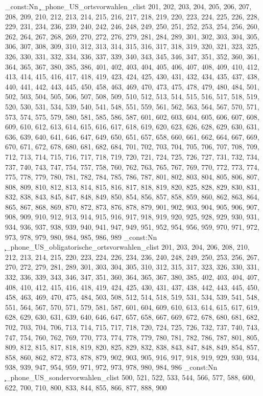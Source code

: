 \clist_const:Nn \c_phone_US_ortsvorwahlen_clist {201,
202,
203,
204,
205,
206,
207,
208,
209,
210,
212,
213,
214,
215,
216,
217,
218,
219,
220,
223,
224,
225,
226,
228,
229,
231,
234,
236,
239,
240,
242,
246,
248,
249,
250,
251,
252,
253,
254,
256,
260,
262,
264,
267,
268,
269,
270,
272,
276,
279,
281,
284,
289,
301,
302,
303,
304,
305,
306,
307,
308,
309,
310,
312,
313,
314,
315,
316,
317,
318,
319,
320,
321,
323,
325,
326,
330,
331,
332,
334,
336,
337,
339,
340,
343,
345,
346,
347,
351,
352,
360,
361,
364,
365,
367,
380,
385,
386,
401,
402,
403,
404,
405,
406,
407,
408,
409,
410,
412,
413,
414,
415,
416,
417,
418,
419,
423,
424,
425,
430,
431,
432,
434,
435,
437,
438,
440,
441,
442,
443,
445,
450,
458,
463,
469,
470,
473,
475,
478,
479,
480,
484,
501,
502,
503,
504,
505,
506,
507,
508,
509,
510,
512,
513,
514,
515,
516,
517,
518,
519,
520,
530,
531,
534,
539,
540,
541,
548,
551,
559,
561,
562,
563,
564,
567,
570,
571,
573,
574,
575,
579,
580,
581,
585,
586,
587,
601,
602,
603,
604,
605,
606,
607,
608,
609,
610,
612,
613,
614,
615,
616,
617,
618,
619,
620,
623,
626,
628,
629,
630,
631,
636,
639,
640,
641,
646,
647,
649,
650,
651,
657,
658,
660,
661,
662,
664,
667,
669,
670,
671,
672,
678,
680,
681,
682,
684,
701,
702,
703,
704,
705,
706,
707,
708,
709,
712,
713,
714,
715,
716,
717,
718,
719,
720,
721,
724,
725,
726,
727,
731,
732,
734,
737,
740,
743,
747,
754,
757,
758,
760,
762,
763,
765,
767,
769,
770,
772,
773,
774,
775,
778,
779,
780,
781,
782,
784,
785,
786,
787,
801,
802,
803,
804,
805,
806,
807,
808,
809,
810,
812,
813,
814,
815,
816,
817,
818,
819,
820,
825,
828,
829,
830,
831,
832,
838,
843,
845,
847,
848,
849,
850,
854,
856,
857,
858,
859,
860,
862,
863,
864,
865,
867,
868,
869,
870,
872,
873,
876,
878,
879, %
901,
902,
903,
904,
905,
906,
907,
908,
909,
910,
912,
913,
914,
915,
916,
917,
918,
919,
920,
925,
928,
929,
930,
931,
934,
936,
937,
938,
939,
940,
941,
947,
949,
951,
952,
954,
956,
959,
970,
971,
972,
973,
978,
979,
980,
984,
985,
986,
989}
\clist_const:Nn \c_phone_US_obligatorische_ortsvorwahlen_clist {201,
203,
204,
206,
208,
210,
212,
213,
214,
215,
220,
223,
224,
226,
234,
236,
240,
248,
249,
250,
253,
256,
267,
270,
272,
279,
281,
289,
301,
303,
304,
305,
310,
312,
315,
317,
323,
326,
330,
331,
332,
336,
339,
343,
346,
347,
351,
360,
364,
365,
367,
380,
385,
402,
403,
404,
407,
408,
410,
412,
415,
416,
418,
419,
424,
425,
430,
431,
437,
438,
442,
443,
445,
450,
458,
463,
469,
470,
475,
484,
503,
508,
512,
514,
518,
519,
531,
534,
539,
541,
548,
551,
564,
567,
570,
571,
579,
581,
587,
601,
604,
609,
610,
613,
614,
615,
617,
619,
628,
629,
630,
631,
639,
640,
646,
647,
657,
658,
667,
669,
672,
678,
680,
681,
682,
702,
703,
704,
706,
713,
714,
715,
717,
718,
720,
724,
725,
726,
732,
737,
740,
743,
747,
754,
760,
762,
769,
770,
773,
774,
778,
779,
780,
781,
782,
786,
787,
801,
805,
809,
812,
815,
817,
818,
819,
820,
825,
829,
832,
838,
843,
847,
848,
849,
854,
857,
858,
860,
862,
872,
873,
878,
879,
902,
903,
905,
916,
917,
918,
919,
929,
930,
934,
938,
939,
947,
954,
959,
971,
972,
973,
978,
980,
984,
986}
\clist_const:Nn \c_phone_US_sondervorwahlen_clist {500,
521,
522,
533,
544,
566,
577,
588,
600,
622,
700,
710,
800,
833,
844,
855,
866,
877,
888,
900}
